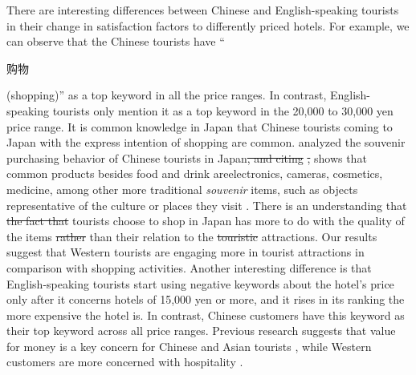 \documentclass[smallextended,natbib]{svjour3}       %
\providecommand{\DIFadd}[1]{{\protect\color{blue}\uwave{#1}}} %
\providecommand{\DIFdel}[1]{{\protect\color{red}\sout{#1}}}                      %
\providecommand{\DIFaddbegin}{} %
\providecommand{\DIFaddend}{} %
\providecommand{\DIFdelbegin}{} %
\providecommand{\DIFdelend}{} %
\newcommand{\DIFscaledelfig}{0.5}
\newlength{\DIFdelgraphicswidth} %
\newlength{\DIFdelgraphicsheight} %
\newcommand{\DIFaddincludegraphics}[2][]{{\color{blue}\fbox{\DIFOincludegraphics[#1]{#2}}}} %
\newcommand{\DIFdelincludegraphics}[2][]{%
\sbox{\DIFdelgraphicsbox}{\DIFOincludegraphics[#1]{#2}}%
\settoboxwidth{\DIFdelgraphicswidth}{\DIFdelgraphicsbox} %
\settoboxtotalheight{\DIFdelgraphicsheight}{\DIFdelgraphicsbox} %
\scalebox{\DIFscaledelfig}{%
\parbox[b]{\DIFdelgraphicswidth}{\usebox{\DIFdelgraphicsbox}\\[-\baselineskip] \rule{\DIFdelgraphicswidth}{0em}}\llap{\resizebox{\DIFdelgraphicswidth}{\DIFdelgraphicsheight}{%
\setlength{\unitlength}{\DIFdelgraphicswidth}%
\begin{picture}(1,1)%
\thicklines\linethickness{2pt} %
{\color[rgb]{1,0,0}\put(0,0){\framebox(1,1){}}}%
{\color[rgb]{1,0,0}\put(0,0){\line( 1,1){1}}}%
{\color[rgb]{1,0,0}\put(0,1){\line(1,-1){1}}}%
\end{picture}%
}\hspace*{3pt}}} %
} %
\DeclareRobustCommand{\DIFaddbegin}{\DIFOaddbegin \let\includegraphics\DIFaddincludegraphics} %
\DeclareRobustCommand{\DIFaddend}{\DIFOaddend \let\includegraphics\DIFOincludegraphics} %
\DeclareRobustCommand{\DIFdelbegin}{\DIFOdelbegin \let\includegraphics\DIFdelincludegraphics} %
\DeclareRobustCommand{\DIFdelend}{\DIFOaddend \let\includegraphics\DIFOincludegraphics} %
\begin{document}
    There are interesting differences between Chinese and English-speaking tourists in their change in satisfaction factors to differently priced hotels. For example, we can observe that the Chinese tourists have ``\begin{CJK}{UTF8}{gbsn}购物\end{CJK} (shopping)'' as a top keyword in all the price ranges. In contrast, English-speaking tourists only mention it as a top keyword in the 20,000 to 30,000 yen price range. It is common knowledge in Japan that Chinese tourists coming to Japan with the express intention of shopping are common. \cite{tsujimoto2017purchasing} analyzed the souvenir purchasing behavior of Chinese tourists in Japan\DIFdelbegin \DIFdel{, and citing }%
\DIFdel{, }\DIFdelend \DIFaddbegin \DIFadd{. The study }\DIFaddend shows that common products besides food and drink are\DIFaddbegin \DIFadd{: }\DIFaddend electronics, cameras, cosmetics, medicine, among other more traditional \textit{souvenir} items, such as objects representative of the culture or places they visit \DIFaddbegin \cite{japan2014consumption}\DIFaddend . There is an understanding that \DIFdelbegin \DIFdel{the fact that }\DIFdelend tourists choose to shop in Japan has more to do with the quality of the items \DIFdelbegin \DIFdel{rather }\DIFdelend than their relation to the \DIFdelbegin \DIFdel{touristic }\DIFdelend \DIFaddbegin \DIFadd{tourist }\DIFaddend attractions. Our results suggest that Western tourists are engaging more in tourist attractions in comparison with shopping activities. Another interesting difference is that English-speaking tourists start using negative keywords about the hotel's price only after it concerns hotels of 15,000 yen or more, and it rises in its ranking the more expensive the hotel is. In contrast, Chinese customers have this keyword as their top keyword across all price ranges. Previous research suggests that value for money is a key concern for Chinese and Asian tourists \cite[][]{choi2000,choi2001,truong2009}, while Western customers are more concerned with hospitality \cite[][]{kozak2002}.  
\end{document}

